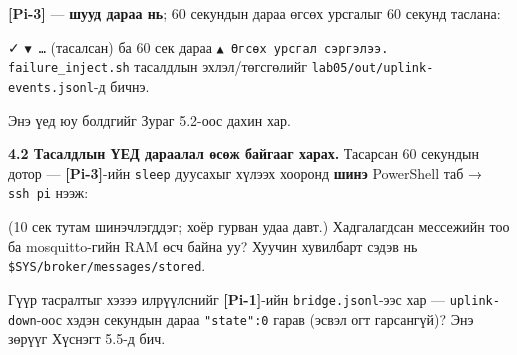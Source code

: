 \begin{Shaded}
\begin{Highlighting}[]
 \KeywordTok{\textbackslash{}}
\end{Highlighting}
\end{Shaded}

\textbf{{[}Pi-3{]}} --- \textbf{шууд дараа нь}; 60 секундын дараа өгсөх урсгалыг 60 секунд таслана:

\begin{Shaded}
\begin{Highlighting}[]
\KeywordTok{\&\&} 
\end{Highlighting}
\end{Shaded}

✓ \texttt{▼\ \ldots{}} (тасалсан) ба 60 сек дараа \texttt{▲\ Өгсөх\ урсгал\ сэргэлээ.\allowbreak{}} \texttt{failure\_\allowbreak{}inject.\allowbreak{}sh} тасалдлын эхлэл/төгсгөлийг \texttt{lab05/\allowbreak{}out/\allowbreak{}uplink-events.\allowbreak{}jsonl}-д бичнэ.

Энэ үед юу болдгийг Зураг 5.2-оос дахин хар.

\textbf{4.2 Тасалдлын ҮЕД дараалал өсөж байгааг харах.} Тасарсан 60 секундын дотор --- \textbf{{[}Pi-3{]}}-ийн \texttt{sleep} дуусахыг хүлээх хооронд \textbf{шинэ} PowerShell таб → \texttt{ssh\ pi} нээж:

\begin{Shaded}
\begin{Highlighting}[]
\end{Highlighting}
\end{Shaded}

(10 сек тутам шинэчлэгддэг; хоёр гурван удаа давт.) Хадгалагдсан мессежийн тоо ба mosquitto-гийн RAM өсч байна уу? Хуучин хувилбарт сэдэв нь \texttt{\$SYS/\allowbreak{}broker/\allowbreak{}messages/\allowbreak{}stored}.

Гүүр тасралтыг хэзээ илрүүлснийг \textbf{{[}Pi-1{]}}-ийн \texttt{bridge.jsonl}-ээс хар --- \texttt{uplink-down}-оос хэдэн секундын дараа \texttt{"state":0} гарав (эсвэл огт гарсангүй)? Энэ зөрүүг Хүснэгт 5.5-д бич.

